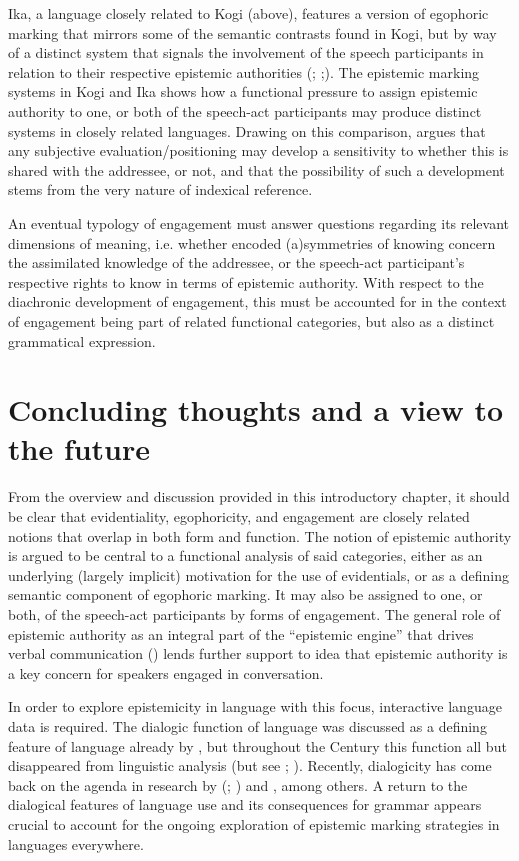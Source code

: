\documentclass[output=paper]{langsci/langscibook}
\begin{document}
Ika, a language closely related to Kogi (above), features a version of egophoric marking that mirrors some of the semantic contrasts found in Kogi, but by way of a distinct system that signals the involvement of the speech participants in relation to their respective epistemic authorities (\citealt{Bergqvist2012}; \citeyear{Bergqvist2018a};\citeyear{Bergqvist2018b}). The epistemic marking systems in Kogi and Ika shows how a functional pressure to assign epistemic authority to one, or both of the speech-act participants may produce distinct systems in closely related languages. Drawing on this comparison, \cite{Bergqvist2018b} argues that any subjective evaluation/positioning may develop a sensitivity to whether this is shared with the addressee, or not, and that the possibility of such a development stems from the very nature of indexical reference.

An eventual typology of engagement must answer questions regarding its relevant dimensions of meaning, i.e. whether encoded (a)symmetries of knowing concern the assimilated knowledge of the addressee, or the speech-act participant’s respective rights to know in terms of epistemic authority. With respect to the diachronic development of engagement, this must be accounted for in the context of engagement being part of related functional categories, but also as a distinct grammatical expression.
%
\section{Concluding thoughts and a view to the future}\label{s:hb4}

From the overview and discussion provided in this introductory chapter, it should be clear that evidentiality, egophoricity, and engagement are closely related notions that overlap in both form and function. The notion of epistemic authority is argued to be central to a functional analysis of said categories, either as an underlying (largely implicit) motivation for the use of evidentials, or as a defining semantic component of egophoric marking. It may also be assigned to one, or both, of the speech-act participants by forms of engagement. The general role of epistemic authority as an integral part of the “epistemic engine” that drives verbal communication (\citealt{Heritage2012}) lends further support to idea that epistemic authority is a key concern for speakers engaged in conversation.

In order to explore epistemicity in language with this focus, interactive language data is required. The dialogic function of language was discussed as a defining feature of language already by \cite{Jespersen1922}, but throughout the  Century this function all but disappeared from linguistic analysis (but see \citealt{Givon2001}; \citealt{Halliday1973}). Recently, dialogicity has come back on the agenda in research by \citeauthor{DuBois2007} (\citeyear{DuBois2007}; \citeyear{DuBois2014}) and \cite{Evans2012}, among others. A return to the dialogical features of language use and its consequences for grammar appears crucial to account for the ongoing exploration of epistemic marking strategies in languages everywhere.
\end{document}
